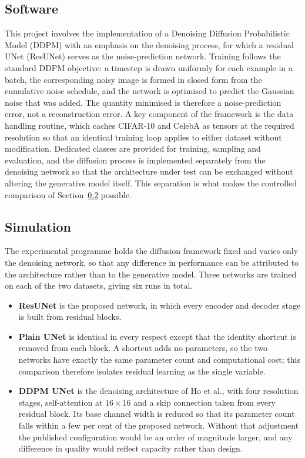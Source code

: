 \subsection{Software}

This project involves the implementation of a Denoising Diffusion Probabilistic Model (DDPM) with an
emphasis on the denoising process, for which a residual UNet (ResUNet) serves as the
noise-prediction network. Training follows the standard DDPM objective: a timestep is drawn
uniformly for each example in a batch, the corresponding noisy image is formed in closed form from
the cumulative noise schedule, and the network is optimised to predict the Gaussian noise that was
added. The quantity minimised is therefore a noise-prediction error, not a reconstruction error. A
key component of the framework is the data handling routine, which caches CIFAR-10 and CelebA as
tensors at the required resolution so that an identical training loop applies to either dataset
without modification. Dedicated classes are provided for training, sampling and evaluation, and the
diffusion process is implemented separately from the denoising network so that the architecture
under test can be exchanged without altering the generative model itself. This separation is what
makes the controlled comparison of Section~\ref{sec:simulation} possible.

\subsection{Simulation}
\label{sec:simulation}

The experimental programme holds the diffusion framework fixed and varies only the denoising
network, so that any difference in performance can be attributed to the architecture rather than to
the generative model. Three networks are trained on each of the two datasets, giving six runs in
total.

\begin{itemize}
    \item \textbf{ResUNet} is the proposed network, in which every encoder and decoder stage is built from residual blocks.
    \item \textbf{Plain UNet} is identical in every respect except that the identity shortcut is removed from each block. A shortcut adds no parameters, so the two networks have exactly the same parameter count and computational cost; this comparison therefore isolates residual learning as the single variable.
    \item \textbf{DDPM UNet} is the denoising architecture of Ho et al., with four resolution stages, self-attention at $16 \times 16$ and a skip connection taken from every residual block. Its base channel width is reduced so that its parameter count falls within a few per cent of the proposed network. Without that adjustment the published configuration would be an order of magnitude larger, and any difference in quality would reflect capacity rather than design.
\end{itemize}

